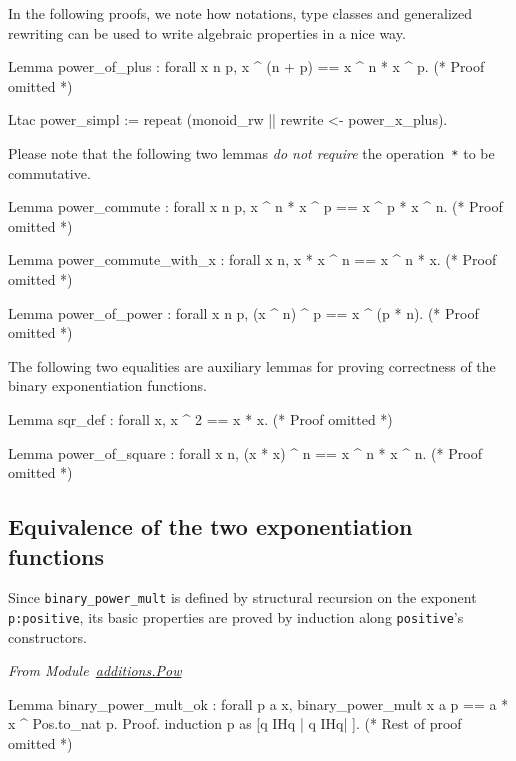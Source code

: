 In the following proofs, we note how notations, type classes and generalized 
rewriting can be used  to write algebraic properties in a nice way.

\begin{Coqsrc}
Lemma power_of_plus :   forall x n p, x ^ (n + p) ==  x ^ n *  x ^ p.
(* Proof omitted *)

Ltac power_simpl := 
    repeat (monoid_rw || rewrite <- power_x_plus).
\end{Coqsrc}

  Please note that the following two lemmas \emph{do not require} 
the operation~\texttt{*} to be commutative.

\begin{Coqsrc}
Lemma power_commute : 
    forall x n p, x ^ n * x ^ p ==  x ^ p * x ^ n. 
(* Proof omitted *) 

Lemma power_commute_with_x : 
    forall x n,  x * x ^ n == x ^ n * x.
(* Proof omitted *) 

Lemma power_of_power : 
   forall x n p,  (x ^ n) ^ p == x ^ (p * n).
(* Proof omitted *) 

\end{Coqsrc}

The following two equalities are auxiliary lemmas for proving correctness of the binary exponentiation functions.

\begin{Coqsrc}
Lemma sqr_def : forall x, x ^ 2 ==  x * x.
(* Proof omitted *) 

Lemma power_of_square : 
  forall x n, (x * x) ^ n ==  x ^ n * x ^ n.
(* Proof omitted *) 
\end{Coqsrc}

\subsection{Equivalence of the two exponentiation functions}

Since \texttt{binary\_power\_mult} is defined by structural recursion on the
exponent \texttt{p:positive}, its basic properties are proved by induction
along \texttt{positive}'s constructors.

\vspace{4pt}
\emph{From Module~\href{../theories/html/hydras.additions.Pow.html}{additions.Pow}}

\begin{Coqsrc}
Lemma binary_power_mult_ok :
  forall p a x,   binary_power_mult  x a p  ==  
                  a * x ^ Pos.to_nat p.
Proof.
  induction p as [q IHq | q IHq| ].
 (* Rest of proof omitted *)
 \end{Coqsrc}

